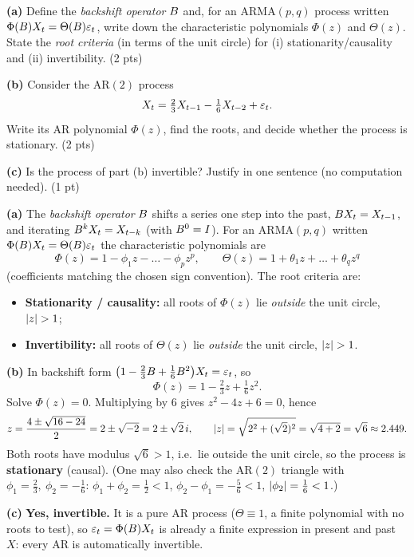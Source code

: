 \documentclass[11pt]{article}
\begin{document}

\statementstart
\textbf{(a)} Define the \emph{backshift operator} $B$ and, for an $\mathrm{ARMA}(p,q)$ process written $\Phi(B)X_t=\Theta(B)\varepsilon_t$, write down the characteristic polynomials $\Phi(z)$ and $\Theta(z)$. State the \emph{root criteria} (in terms of the unit circle) for (i) stationarity/causality and (ii) invertibility. \hfill(2 pts)

\textbf{(b)} Consider the $\mathrm{AR}(2)$ process
\[
X_t=\tfrac23 X_{t-1}-\tfrac16 X_{t-2}+\varepsilon_t .
\]
Write its AR polynomial $\Phi(z)$, find the roots, and decide whether the process is stationary. \hfill(2 pts)

\textbf{(c)} Is the process of part (b) invertible? Justify in one sentence (no computation needed). \hfill(1 pt)
\statementend

\textbf{(a)} The \emph{backshift operator} $B$ shifts a series one step into the past, $B X_t=X_{t-1}$, and iterating $B^k X_t=X_{t-k}$ (with $B^0=I$). For an $\mathrm{ARMA}(p,q)$ written $\Phi(B)X_t=\Theta(B)\varepsilon_t$ the characteristic polynomials are
\[
\Phi(z)=1-\phi_1 z-\dots-\phi_p z^{p},\qquad
\Theta(z)=1+\theta_1 z+\dots+\theta_q z^{q}
\]
(coefficients matching the chosen sign convention). The root criteria are:
\begin{itemize}
  \item \textbf{Stationarity / causality:} all roots of $\Phi(z)$ lie \emph{outside} the unit circle, $\left\lvert z \right\rvert>1$;
  \item \textbf{Invertibility:} all roots of $\Theta(z)$ lie \emph{outside} the unit circle, $\left\lvert z \right\rvert>1$.
\end{itemize}

\textbf{(b)} In backshift form $\big(1-\tfrac23B+\tfrac16B^2\big)X_t=\varepsilon_t$, so
\[
\Phi(z)=1-\tfrac23 z+\tfrac16 z^2 .
\]
Solve $\Phi(z)=0$. Multiplying by $6$ gives $z^2-4z+6=0$, hence
\[
z=\frac{4\pm\sqrt{16-24}}{2}=2\pm\sqrt{-2}=2\pm\sqrt2\,i,
\qquad
\left\lvert z \right\rvert=\sqrt{2^2+(\sqrt2)^2}=\sqrt{4+2}=\sqrt6\approx2.449 .
\]
Both roots have modulus $\sqrt6>1$, i.e.\ lie outside the unit circle, so the process is \textbf{stationary} (causal). (One may also check the $\mathrm{AR}(2)$ triangle with $\phi_1=\tfrac23,\ \phi_2=-\tfrac16$: $\phi_1+\phi_2=\tfrac12<1$, $\phi_2-\phi_1=-\tfrac56<1$, $\left\lvert \phi_2 \right\rvert=\tfrac16<1$.)

\textbf{(c)} \textbf{Yes, invertible.} It is a pure $\mathrm{AR}$ process ($\Theta\equiv1$, a finite polynomial with no roots to test), so $\varepsilon_t=\Phi(B)X_t$ is already a finite expression in present and past $X$: every $\mathrm{AR}$ is automatically invertible.
\end{document}
